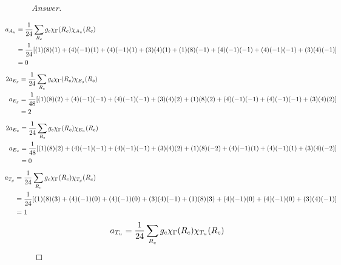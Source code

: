 \documentclass[../psets.tex]{subfiles}
\begin{document}
\begin{enumerate}[label={\Roman*)}]
\begin{enumerate}[label={\alph*)}]
\begin{proof}[Answer]
\begin{align*}
            \end{align*}
            \begin{align*}
                \hspace{-4em}a_{A_u} &= \frac{1}{24}\sum_{R_c}g_c\chi_\Gamma(R_c)\chi_{A_u}(R_c)\\
                \hspace{-4em}&= \frac{1}{24}[(1)(8)(1)+(4)(-1)(1)+(4)(-1)(1)+(3)(4)(1)+(1)(8)(-1)+(4)(-1)(-1)+(4)(-1)(-1)+(3)(4)(-1)]\\
                \hspace{-4em}&= 0
            \end{align*}
            \begin{align*}
                \hspace{-4em}2a_{E_g} &= \frac{1}{24}\sum_{R_c}g_c\chi_\Gamma(R_c)\chi_{E_g}(R_c)\\
                \hspace{-4em}a_{E_g} &= \frac{1}{48}[(1)(8)(2)+(4)(-1)(-1)+(4)(-1)(-1)+(3)(4)(2)+(1)(8)(2)+(4)(-1)(-1)+(4)(-1)(-1)+(3)(4)(2)]\\
                \hspace{-4em}&= 2
            \end{align*}
            \begin{align*}
                \hspace{-4em}2a_{E_u} &= \frac{1}{24}\sum_{R_c}g_c\chi_\Gamma(R_c)\chi_{E_u}(R_c)\\
                \hspace{-4em}a_{E_u} &= \frac{1}{48}[(1)(8)(2)+(4)(-1)(-1)+(4)(-1)(-1)+(3)(4)(2)+(1)(8)(-2)+(4)(-1)(1)+(4)(-1)(1)+(3)(4)(-2)]\\
                \hspace{-4em}&= 0
            \end{align*}
            \begin{align*}
                \hspace{-4em}a_{T_g} &= \frac{1}{24}\sum_{R_c}g_c\chi_\Gamma(R_c)\chi_{T_g}(R_c)\\
                \hspace{-4em}&= \frac{1}{24}[(1)(8)(3)+(4)(-1)(0)+(4)(-1)(0)+(3)(4)(-1)+(1)(8)(3)+(4)(-1)(0)+(4)(-1)(0)+(3)(4)(-1)]\\
                \hspace{-4em}&= 1
            \end{align*}
            \begin{align*}
                \hspace{-4em}a_{T_u} &= \frac{1}{24}\sum_{R_c}g_c\chi_\Gamma(R_c)\chi_{T_u}(R_c)\\

\end{align*}
\end{proof}
\end{enumerate}
\end{enumerate}
\end{document}
